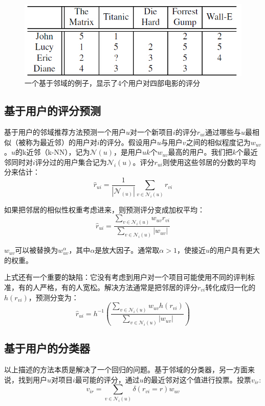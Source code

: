 \documentclass{article}
\begin{document}
 \begin{figure}[!htb]
	  \begin{center}
	  	\includegraphics[scale=0.6]{f1.jpg}
	  	\caption{一个基于邻域的例子，显示了4个用户对四部电影的评分}
	  \end{center}
 \end{figure}

 \subsection{基于用户的评分预测}
 基于用户的邻域推荐方法预测一个用户$u$对一个新项目$i$的评分$r_{ui}$通过哪些与$u$最相似（被称为最近邻）的用户对$i$的评分。假设用户$u$与用户$v$之间的相似程度记为$w_{uv}$。$u$的k近邻（k-NN），记为$\mathcal{N}(u)$，是用户$u$$k$个$w_{uv}$最高的用户。我们把$k$个最近邻同时对$i$评分过的用户集合记为$\mathcal{N}_i(u)$。评分$r_{ui}$则使用这些邻居的分数的平均分来估计：
 $$ \hat{r}_{ui}=\frac{1}{|\mathcal{N}_(u)|}\mathop{\sum}\limits_{v\in\mathcal{N}_i(u)}r_{vi} $$

 如果把邻居的相似性权重考虑进来，则预测评分变成加权平均：
 $$ \hat{r}_{ui}=\frac{\mathop{\sum}\limits_{v\in\mathcal{N}_i(u)}w_{uv}r_{vi}}{\mathop{\sum}\limits_{v\in\mathcal{N}_i(u)}|w_{uv}|} $$

 $w_{uv}$可以被替换为$w^{\alpha}_{uv}$，其中$\alpha$是放大因子。通常取$\alpha>1$，使接近$u$的用户具有更大的权重。

 上式还有一个重要的缺陷：它没有考虑到用户对一个项目可能使用不同的评判标准，有的人严格，有的人宽松。解决方法通常是把邻居的评分$r_{vi}$转化成归一化的$h(r_{vi})$，预测分变为：
 $$ \hat{r}_{ui}=h^{-1}\left(\frac{\mathop{\sum}\limits_{v\in\mathcal{N}_i(u)}w_{uv}h(r_{vi})}{\mathop{\sum}\limits_{v\in\mathcal{N}_i(u)}|w_{uv}|}\right) $$

 \subsection{基于用户的分类器}
 以上描述的方法本质是解决了一个回归的问题。基于邻域的分类器，另一方面来说，找到用户$u$对项目$i$最可能的评分，通过$u$的最近邻对这个值进行投票。投票$v_{ir}$:
 $$ v_{ir}=\mathop{\sum}\limits_{v\in\mathcal{N}_i(u)}\delta(r_{vi}=r)w_{uv} $$
\end{document}
